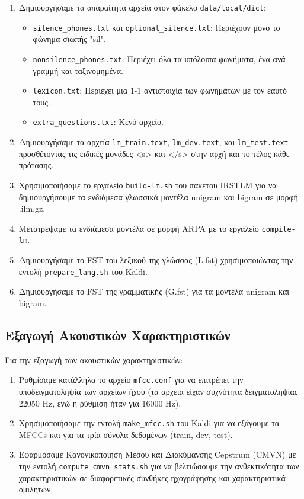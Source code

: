 \documentclass[a4paper,12pt]{article}
\begin{document}
\begin{enumerate}
    \item Δημιουργήσαμε τα απαραίτητα αρχεία στον φάκελο \texttt{data/local/dict}:
    \begin{itemize}
        \item \texttt{silence\_phones.txt} και \texttt{optional\_silence.txt}: Περιέχουν μόνο το φώνημα σιωπής "sil".
        \item \texttt{nonsilence\_phones.txt}: Περιέχει όλα τα υπόλοιπα φωνήματα, ένα ανά γραμμή και ταξινομημένα.
        \item \texttt{lexicon.txt}: Περιέχει μια 1-1 αντιστοιχία των φωνημάτων με τον εαυτό τους.
        \item \texttt{extra\_questions.txt}: Κενό αρχείο.
    \end{itemize}
    
    \item Δημιουργήσαμε τα αρχεία \texttt{lm\_train.text}, \texttt{lm\_dev.text}, και \texttt{lm\_test.text} προσθέτοντας τις ειδικές μονάδες <s> και </s> στην αρχή και το τέλος κάθε πρότασης.
    
    \item Χρησιμοποιήσαμε το εργαλείο \texttt{build-lm.sh} του πακέτου IRSTLM για να δημιουργήσουμε τα ενδιάμεσα γλωσσικά μοντέλα unigram και bigram σε μορφή .ilm.gz.
    
    \item Μετατρέψαμε τα ενδιάμεσα μοντέλα σε μορφή ARPA με το εργαλείο \texttt{compile-lm}.
    
    \item Δημιουργήσαμε το FST του λεξικού της γλώσσας (L.fst) χρησιμοποιώντας την εντολή \texttt{prepare\_lang.sh} του Kaldi.
    
    \item Δημιουργήσαμε το FST της γραμματικής (G.fst) για τα μοντέλα unigram και bigram.
\end{enumerate}

\subsection{Εξαγωγή Ακουστικών Χαρακτηριστικών}

Για την εξαγωγή των ακουστικών χαρακτηριστικών:

\begin{enumerate}
    \item Ρυθμίσαμε κατάλληλα το αρχείο \texttt{mfcc.conf} για να επιτρέπει την υποδειγματοληψία των αρχείων ήχου (τα αρχεία είχαν συχνότητα δειγματοληψίας 22050 Hz, ενώ η ρύθμιση ήταν για 16000 Hz).
    
    \item Χρησιμοποιήσαμε την εντολή \texttt{make\_mfcc.sh} του Kaldi για να εξάγουμε τα MFCCs και για τα τρία σύνολα δεδομένων (train, dev, test).
    
    \item Εφαρμόσαμε Κανονικοποίηση Μέσου και Διακύμανσης Cepstrum (CMVN) με την εντολή \texttt{compute\_cmvn\_stats.sh} για να βελτιώσουμε την ανθεκτικότητα των χαρακτηριστικών σε διαφορετικές συνθήκες ηχογράφησης και χαρακτηριστικά ομιλητών.
\end{enumerate}
\end{document}
